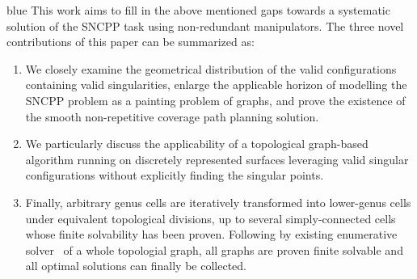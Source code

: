 \documentclass[Afour,sageh,times]{sagej}
\begin{document}
\begin{color}{blue}
This work aims to fill in the above mentioned gaps towards a systematic solution of the SNCPP task using non-redundant manipulators. The three novel contributions of this paper can be summarized as:
\begin{enumerate}
\item We closely examine the geometrical distribution of the valid configurations containing valid singularities, enlarge the applicable horizon of modelling the SNCPP problem as a painting problem of graphs, and prove the existence of the smooth non-repetitive coverage path planning solution. 
\item We particularly discuss the applicability of a topological graph-based algorithm running on discretely represented surfaces leveraging valid singular configurations without explicitly finding the singular points. 
\item Finally, arbitrary genus cells are iteratively transformed into lower-genus cells under equivalent topological divisions, up to several simply-connected cells whose finite solvability has been proven. Following by existing enumerative solver~\cite{Yang2020Cellular} of a whole topologial graph, all graphs are proven finite solvable and all optimal solutions can finally be collected. 
\end{enumerate}







\end{color}
\end{document}
